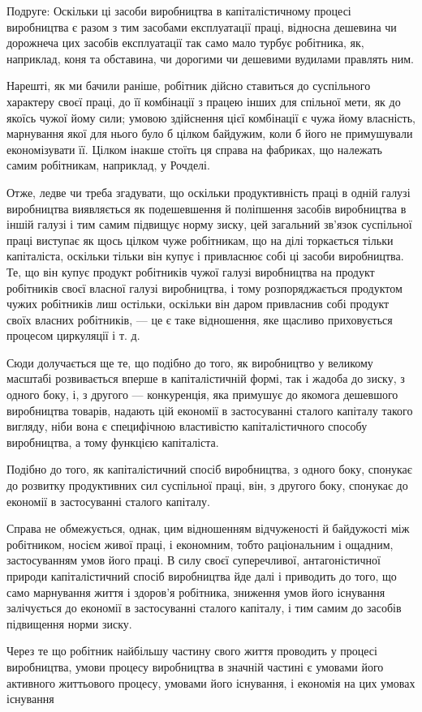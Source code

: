 Подруге: Оскільки ці засоби виробництва в капіталістичному
процесі виробництва є разом з тим засобами експлуатації праці,
відносна дешевина чи дорожнеча цих засобів експлуатації так
само мало турбує робітника, як, наприклад, коня та обставина,
чи дорогими чи дешевими вудилами правлять ним.

Нарешті, як ми бачили раніше, робітник дійсно ставиться
до суспільного характеру своєї праці, до її комбінації з працею
інших для спільної мети, як до якоїсь чужої йому сили; умовою
здійснення цієї комбінації є чужа йому власність, марнування
якої для нього було б цілком байдужим, коли б його не примушували
економізувати її. Цілком інакше стоїть ця справа
на фабриках, що належать самим робітникам, наприклад, у Рочделі.

Отже, ледве чи треба згадувати, що оскільки продуктивність
праці в одній галузі виробництва виявляється як подешевшення
й поліпшення засобів виробництва в іншій галузі і тим самим
підвищує норму зиску, цей загальний зв’язок суспільної праці
виступає як щось цілком чуже робітникам, що на ділі торкається
тільки капіталіста, оскільки тільки він купує і привласнює
собі ці засоби виробництва. Те, що він купує продукт робітників чужої галузі виробництва на продукт
робітників своєї власної галузі виробництва, і тому розпоряджається продуктом чужих робітників лиш
остільки, оскільки він даром привласнив собі продукт своїх власних робітників, — це є таке
відношення,
яке щасливо приховується процесом циркуляції і т. д.

Сюди долучається ще те, що подібно до того, як виробництво у великому масштабі розвивається вперше в
капіталістичній формі, так і жадоба до зиску, з одного боку, і, з другого — конкуренція, яка
примушує до якомога дешевшого виробництва товарів, надають цій економії в застосуванні сталого
капіталу такого вигляду, ніби вона є специфічною властивістю
капіталістичного способу виробництва, а тому функцією капіталіста.

Подібно до того, як капіталістичний спосіб виробництва,
з одного боку, спонукає до розвитку продуктивних сил суспільної праці, він, з другого боку, спонукає
до економії в застосуванні сталого капіталу.

Справа не обмежується, однак, цим відношенням відчуженості
й байдужості між робітником, носієм живої праці, і економним,
тобто раціональним і ощадним, застосуванням умов його праці.
В силу своєї суперечливої, антагоністичної природи капіталістичний спосіб виробництва йде далі і
приводить до того, що само
марнування життя і здоров’я робітника, зниження умов його
існування залічується до економії в застосуванні сталого капіталу, і тим самим до засобів підвищення
норми зиску.

Через те що робітник найбільшу частину свого життя проводить у процесі виробництва, умови процесу
виробництва
в значній частині є умовами його активного життьового процесу, умовами його існування, і економія на
цих умовах існування
